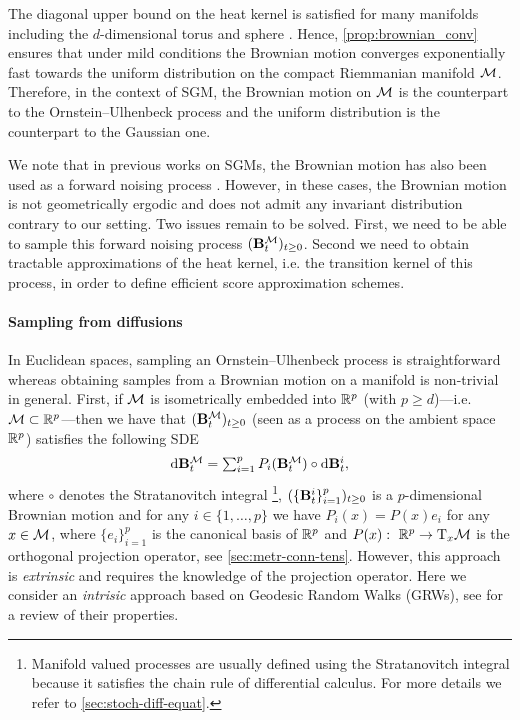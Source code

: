 The diagonal upper bound on the heat kernel is satisfied for many manifolds
including the $d$-dimensional torus and sphere \cite[see][Section
3]{saloff1994precise}. Hence, \cref{prop:brownian_conv} ensures that under mild
conditions the Brownian motion converges exponentially fast towards the uniform
distribution on the compact Riemmanian manifold $\mathcal M$. Therefore, in the context
of SGM, the Brownian motion on $\mathcal M$ is the counterpart to the Ornstein--Ulhenbeck
process and the uniform distribution is the counterpart to the Gaussian one.

We note that in previous works on SGMs, the Brownian motion has also been used
as a forward noising process \citep{song2020score,song2019generative}. However,
in these cases, the Brownian motion is not geometrically ergodic and does not
admit any invariant distribution contrary to our setting. Two issues remain to
be solved. First, we need to be able to sample this forward noising process
$(\mathbf{B}_t^\mathcal M)_{t \geq 0}$. Second we need to obtain tractable approximations of
the heat kernel, i.e. the transition kernel of this process, in order to define
efficient score approximation schemes.

\paragraph{Sampling from diffusions}
In Euclidean spaces, sampling an Ornstein--Ulhenbeck process is straightforward
whereas obtaining samples from a Brownian motion on a manifold is non-trivial in
general. First, if $\mathcal M$ is isometrically embedded into $\mathbb{R}^p$ (with
$p \geq d$)---i.e.\ $\mathcal M \subset \mathbb{R}^p$---then we have that
$(\mathbf{B}^\mathcal M_t)_{t \geq 0}$ (seen as a process on the ambient space $\mathbb{R}^p$)
satisfies the following SDE
\begin{equation}
  \label{eq:brownian_motion_extrinsic}
  \textstyle{\mathrm{d}\mathbf{B}^\mathcal M_t = \sum_{i=1}^p P_i(\mathbf{B}^\mathcal M_t) \circ \mathrm{d}\mathbf{B}_t^i,}
\end{equation}
where $\circ$ denotes the Stratanovitch integral \footnote{Manifold valued processes are usually defined using the Stratanovitch integral because it satisfies the chain rule of differential calculus. For more details we refer to \cref{sec:stoch-diff-equat}.},
$(\{\mathbf{B}_t^i\}_{i=1}^p)_{t \geq 0}$ is a $p$-dimensional Brownian motion and for
any $i \in \{1, \dots, p\}$ we have $P_i(x) = P(x) e_i$ for any $x \in \mathcal M$, where $\{e_i\}_{i=1}^p$ is the canonical basis of $\mathbb{R}^p$
and $P(x): \ \mathbb{R}^p \to \mathrm{T}_x \mathcal M$ is the orthogonal projection operator,
see \cref{sec:metr-conn-tens}. However, this approach is \emph{extrinsic} and
requires the knowledge of the projection
operator. %
Here we consider an \emph{intrisic} 
approach based on Geodesic Random Walks (GRWs), see \cite{jorgensen1975central}
for a review of their properties.

